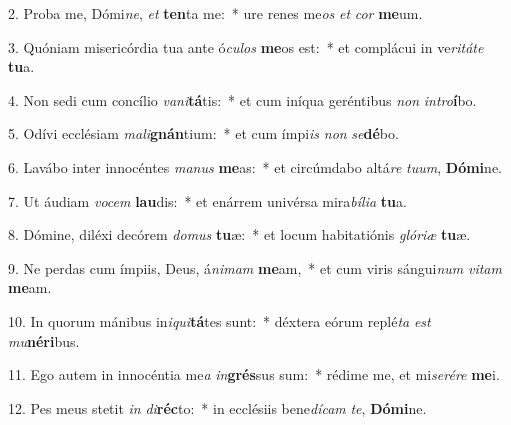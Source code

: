 2. Proba me, Dómi\textit{ne}, \textit{et} \textbf{ten}ta me:~*  ure renes me\textit{os} \textit{et} \textit{cor} \textbf{me}um.\

3. Quóniam misericórdia tua ante ó\textit{cu}\textit{los} \textbf{me}os est:~*  et complácui in ve\textit{ri}\textit{tá}\textit{te} \textbf{tu}a.\

4. Non sedi cum concílio \textit{va}\textit{ni}\textbf{tá}tis:~*  et cum iníqua geréntibus \textit{non} \textit{in}\textit{tro}\textbf{í}bo.\

5. Odívi ecclésiam \textit{ma}\textit{li}\textbf{gnán}tium:~*  et cum ímpi\textit{is} \textit{non} \textit{se}\textbf{dé}bo.\

6. Lavábo inter innocéntes \textit{ma}\textit{nus} \textbf{me}as:~*  et circúmdabo altá\textit{re} \textit{tu}\textit{um}, \textbf{Dó}\textbf{mi}ne.\

7. Ut áudiam \textit{vo}\textit{cem} \textbf{lau}dis:~*  et enárrem univérsa mira\textit{bí}\textit{li}\textit{a} \textbf{tu}a.\

8. Dómine, diléxi decórem \textit{do}\textit{mus} \textbf{tu}æ:~*  et locum habitatiónis \textit{gló}\textit{ri}\textit{æ} \textbf{tu}æ.\

9. Ne perdas cum ímpiis, Deus, á\textit{ni}\textit{mam} \textbf{me}am,~*  et cum viris sángui\textit{num} \textit{vi}\textit{tam} \textbf{me}am.\

10. In quorum mánibus in\textit{i}\textit{qui}\textbf{tá}tes sunt:~*  déxtera eórum replé\textit{ta} \textit{est} \textit{mu}\textbf{né}\textbf{ri}bus.\

11. Ego autem in innocéntia me\textit{a} \textit{in}\textbf{grés}sus sum:~*  rédime me, et mi\textit{se}\textit{ré}\textit{re} \textbf{me}i.\

12. Pes meus stetit \textit{in} \textit{di}\textbf{réc}to:~*  in ecclésiis bene\textit{dí}\textit{cam} \textit{te}, \textbf{Dó}\textbf{mi}ne.\


